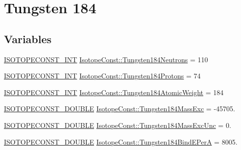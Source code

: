 \hypertarget{group___isotope_const-_tungsten-_w184}{}\section{Tungsten 184}
\label{group___isotope_const-_tungsten-_w184}
\subsection*{Variables}
\begin{DoxyCompactItemize}
\item 
\mbox{\hyperlink{group___isotope_const-_macros_ga5f18360b3e99483a35c32d789e62621c}{I\+S\+O\+T\+O\+P\+E\+C\+O\+N\+S\+T\+\_\+\+I\+NT}} \mbox{\hyperlink{group___isotope_const-_tungsten-_w184_ga38b8aeb278eb3776601828a25727d70c}{Isotope\+Const\+::\+Tungsten184\+Neutrons}} = 110
\item 
\mbox{\hyperlink{group___isotope_const-_macros_ga5f18360b3e99483a35c32d789e62621c}{I\+S\+O\+T\+O\+P\+E\+C\+O\+N\+S\+T\+\_\+\+I\+NT}} \mbox{\hyperlink{group___isotope_const-_tungsten-_w184_gae31244fbf6a149194be5cebf3f51c16a}{Isotope\+Const\+::\+Tungsten184\+Protons}} = 74
\item 
\mbox{\hyperlink{group___isotope_const-_macros_ga5f18360b3e99483a35c32d789e62621c}{I\+S\+O\+T\+O\+P\+E\+C\+O\+N\+S\+T\+\_\+\+I\+NT}} \mbox{\hyperlink{group___isotope_const-_tungsten-_w184_gaed13250ae0173bf27c4b5a08589e716f}{Isotope\+Const\+::\+Tungsten184\+Atomic\+Weight}} = 184
\item 
\mbox{\hyperlink{group___isotope_const-_macros_ga8f45a7272ce02c0b4c65c44636ed719a}{I\+S\+O\+T\+O\+P\+E\+C\+O\+N\+S\+T\+\_\+\+D\+O\+U\+B\+LE}} \mbox{\hyperlink{group___isotope_const-_tungsten-_w184_ga936ce3bcb4d1b86f91b8122a8a11d995}{Isotope\+Const\+::\+Tungsten184\+Mass\+Exc}} = -\/45705.
\item 
\mbox{\hyperlink{group___isotope_const-_macros_ga8f45a7272ce02c0b4c65c44636ed719a}{I\+S\+O\+T\+O\+P\+E\+C\+O\+N\+S\+T\+\_\+\+D\+O\+U\+B\+LE}} \mbox{\hyperlink{group___isotope_const-_tungsten-_w184_ga24de14b6b66435d3f780bef85411e705}{Isotope\+Const\+::\+Tungsten184\+Mass\+Exc\+Unc}} = 0.
\item 
\mbox{\hyperlink{group___isotope_const-_macros_ga8f45a7272ce02c0b4c65c44636ed719a}{I\+S\+O\+T\+O\+P\+E\+C\+O\+N\+S\+T\+\_\+\+D\+O\+U\+B\+LE}} \mbox{\hyperlink{group___isotope_const-_tungsten-_w184_ga3afe3b06f25093ebcd51fe424e5f0de2}{Isotope\+Const\+::\+Tungsten184\+Bind\+E\+PerA}} = 8005.
\item 

\end{DoxyCompactItemize}
